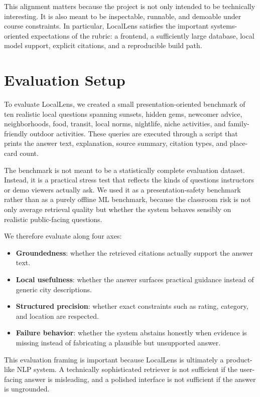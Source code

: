 \documentclass[11pt]{article}
\begin{document}
This alignment matters because the project is not only intended to be technically interesting. It is also meant to be inspectable, runnable, and demoable under course constraints. In particular, LocalLens satisfies the important systems-oriented expectations of the rubric: a frontend, a sufficiently large database, local model support, explicit citations, and a reproducible build path.

\section{Evaluation Setup}
To evaluate LocalLens, we created a small presentation-oriented benchmark of ten realistic local questions spanning sunsets, hidden gems, newcomer advice, neighborhoods, food, transit, local norms, nightlife, niche activities, and family-friendly outdoor activities. These queries are executed through a script that prints the answer text, explanation, source summary, citation types, and place-card count.

The benchmark is not meant to be a statistically complete evaluation dataset. Instead, it is a practical stress test that reflects the kinds of questions instructors or demo viewers actually ask. We used it as a presentation-safety benchmark rather than as a purely offline ML benchmark, because the classroom risk is not only average retrieval quality but whether the system behaves sensibly on realistic public-facing questions.

We therefore evaluate along four axes:
\begin{itemize}[leftmargin=*]
    \item \textbf{Groundedness}: whether the retrieved citations actually support the answer text.
    \item \textbf{Local usefulness}: whether the answer surfaces practical guidance instead of generic city descriptions.
    \item \textbf{Structured precision}: whether exact constraints such as rating, category, and location are respected.
    \item \textbf{Failure behavior}: whether the system abstains honestly when evidence is missing instead of fabricating a plausible but unsupported answer.
\end{itemize}

This evaluation framing is important because LocalLens is ultimately a product-like NLP system. A technically sophisticated retriever is not sufficient if the user-facing answer is misleading, and a polished interface is not sufficient if the answer is ungrounded.
\end{document}
